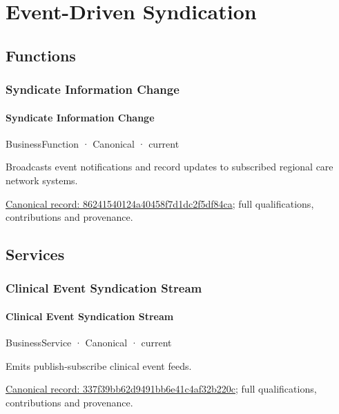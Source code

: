 \section{Event-Driven Syndication}

\subsection{Functions}

\subsubsection{Syndicate Information Change}

\paragraph{Syndicate Information Change}

\label{element:86241540124a40458f7d1dc2f5df84ca}
{\small BusinessFunction · Canonical · current}\par

Broadcasts event notifications and record updates to subscribed regional care network systems.


{\footnotesize \href{../../../../continuum/business/business-function/86241540124a40458f7d1dc2f5df84ca.md}{Canonical record: 86241540124a40458f7d1dc2f5df84ca}; full qualifications, contributions and provenance.}\par
\subsection{Services}

\subsubsection{Clinical Event Syndication Stream}

\paragraph{Clinical Event Syndication Stream}

\label{element:337f39bb62d9491bb6e41c4af32b220c}
{\small BusinessService · Canonical · current}\par

Emits publish-subscribe clinical event feeds.


{\footnotesize \href{../../../../continuum/business/business-service/337f39bb62d9491bb6e41c4af32b220c.md}{Canonical record: 337f39bb62d9491bb6e41c4af32b220c}; full qualifications, contributions and provenance.}\par
